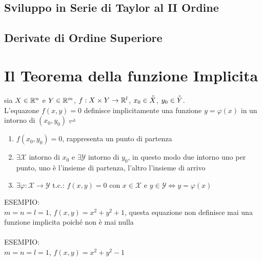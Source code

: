 \subsection{Sviluppo in Serie di Taylor al II Ordine}

\subsection{Derivate di Ordine Superiore}

\section{Il Teorema della funzione Implicita}
sia $X\in \mathbb{R}^n$ e $Y\in \mathbb{R}^m$, $f:X\times Y\to \mathbb{\mathbb{R}}^l$, $x_0\in \accentset{\circ}{X}$, $y_0\in \accentset{\circ}{Y}$.\\
L'equazone $f(x,y)=0$ definisce implicitamente una funzione $y=\varphi(x)$ in un intorno di $(x_0,y_0) \rightleftharpoons$
\begin{enumerate}
	\item $f(x_0,y_0)=0$, rappresenta un punto di partenza 
	\item $\exists \mathcal{X}$ intorno di $x_0$ e $\exists \mathcal{Y}$ intorno di $y_0$, in questo modo due intorno uno per punto, uno è l'insieme di partenza, l'altro l'insieme di arrivo
	\item $\exists\varphi:\mathcal{X}\rightarrow\mathcal{Y}$ t.c.: $f(x,y)=0$ con $x\in\mathcal{X}$ e $y\in\mathcal{Y} \Leftrightarrow y=\varphi(x)$
\end{enumerate}
ESEMPIO:\\
$m=n=l=1$, $f(x,y)=x^2+y^2+1$, questa equazione non definisce mai una funzione implicita poiché non è mai nulla\\
\\
ESEMPIO:\\
$m=n=l=1$, $f(x,y)=x^2+y^2-1$\\
	\\

